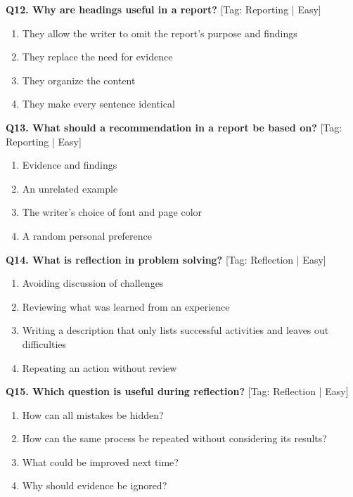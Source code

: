 \noindent\textbf{Q12. Why are headings useful in a report?} \hfill [Tag: Reporting | Easy]
\begin{enumerate}[label=(\alph*),topsep=2pt,itemsep=1pt,partopsep=0pt,parsep=0pt]
    \item {They allow the writer to omit the report's purpose and findings}
    \item {They replace the need for evidence}
    \item {They organize the content}
    \item {They make every sentence identical}
\end{enumerate}
\vspace{2mm}

\noindent\textbf{Q13. What should a recommendation in a report be based on?} \hfill [Tag: Reporting | Easy]
\begin{enumerate}[label=(\alph*),topsep=2pt,itemsep=1pt,partopsep=0pt,parsep=0pt]
    \item {Evidence and findings}
    \item {An unrelated example}
    \item {The writer's choice of font and page color}
    \item {A random personal preference}
\end{enumerate}
\vspace{2mm}

\noindent\textbf{Q14. What is reflection in problem solving?} \hfill [Tag: Reflection | Easy]
\begin{enumerate}[label=(\alph*),topsep=2pt,itemsep=1pt,partopsep=0pt,parsep=0pt]
    \item {Avoiding discussion of challenges}
    \item {Reviewing what was learned from an experience}
    \item {Writing a description that only lists successful activities and leaves out difficulties}
    \item {Repeating an action without review}
\end{enumerate}
\vspace{2mm}

\noindent\textbf{Q15. Which question is useful during reflection?} \hfill [Tag: Reflection | Easy]
\begin{enumerate}[label=(\alph*),topsep=2pt,itemsep=1pt,partopsep=0pt,parsep=0pt]
    \item {How can all mistakes be hidden?}
    \item {How can the same process be repeated without considering its results?}
    \item {What could be improved next time?}
    \item {Why should evidence be ignored?}
\end{enumerate}
\vspace{2mm}

